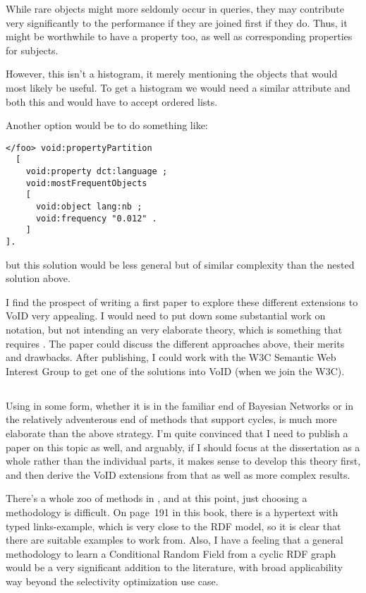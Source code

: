 While rare objects might more seldomly occur in queries, they may
contribute very significantly to the performance if they are joined
first if they do. Thus, it might be worthwhile to have a property
 too, as well as corresponding
properties for subjects.


However, this isn't a histogram, it merely mentioning the objects that
would most likely be useful. To get a histogram we would need a
similar  attribute and both this and
 would have to accept ordered
lists. 

Another option would be to do something like:
\begin{verbatim}
</foo> void:propertyPartition 
  [
    void:property dct:language ;
    void:mostFrequentObjects 
    [
      void:object lang:nb ;
      void:frequency "0.012" .
    ]
].
\end{verbatim}
but this solution would be less general but of similar complexity than
the nested solution above.

I find the prospect of writing a first paper to explore these different
extensions to VoID very appealing. I would need to put down some
substantial work on notation, but not intending an very elaborate
theory, which is something that requires \SRL. The paper could discuss
the different approaches above, their merits and drawbacks. After
publishing, I could work with the W3C Semantic Web Interest Group to
get one of the solutions into VoID (when we join the W3C).


\subsection{\SRL}

Using \SRL{} in some form, whether it is in the familiar end of
Bayesian Networks or in the relatively adventerous end of methods that
support cycles, is much more elaborate than the above strategy. I'm
quite convinced that I need to publish a paper on this topic as well,
and arguably, if I should focus at the dissertation as a whole rather
than the individual parts, it makes sense to develop this theory
first, and then derive the VoID extensions from that as well as more
complex results.

There's a whole zoo of methods in \cite{srlbook}, and at this point,
just choosing a methodology is difficult. On page~191 in this book,
there is a hypertext with typed links-example, which is very close to
the RDF model, so it is clear that there are suitable examples to work
from. Also, I have a feeling that a general methodology to learn a
Conditional Random Field from a cyclic RDF graph would be a very
significant addition to the literature, with broad applicability way
beyond the selectivity optimization use case.

